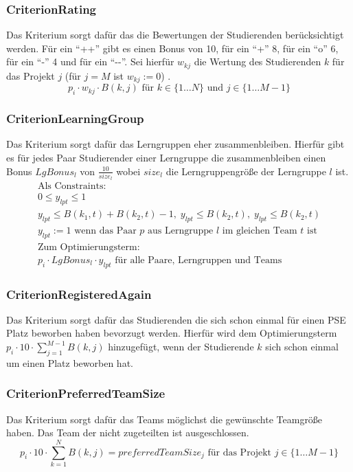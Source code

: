 \documentclass[parskip=full]{scrartcl}
\begin{document}
\subsubsection{CriterionRating}
Das Kriterium sorgt dafür das die Bewertungen der Studierenden berücksichtigt
werden. Für ein \enquote{++} gibt es einen Bonus von 10, für ein \enquote{+} 8,
für ein \enquote{o} 6, für ein \enquote{-} 4 und für ein \enquote{-{}-}. Sei
hierfür $w_{kj}$ die Wertung des Studierenden $k$ für das Projekt $j$ (für $j =
M$ ist $w_{kj} := 0$) .
\begin{equation*}
p_i \cdot w_{kj} \cdot B(k,j) \text{ für } k \in \{ 1\ldots N \} \text{ und }j
\in \{ 1\ldots M -1 \}
\end{equation*}

\subsubsection{CriterionLearningGroup}
Das Kriterium sorgt dafür das Lerngruppen eher zusammenbleiben. Hierfür gibt es
für jedes Paar Studierender einer Lerngruppe die zusammenbleiben einen Bonus
$LgBonus_l$ von $\frac{10}{size_l}$ wobei $size_l$ die Lerngruppengröße der
Lerngruppe $l$ ist.
\begin{gather*}
\text{Als Constraints: }\\
0 \le y_{lpt} \le 1  \\
y_{lpt} \le B(k_1,t) + B(k_2,t) -1, \; y_{lpt} \le B(k_2,t), \; y_{lpt} \le
B(k_2,t) \\
\text{$y_{lpt} := 1$ wenn das Paar $p$ aus
Lerngruppe $l$ im gleichen Team $t$ ist} \\
\text{Zum Optimierungsterm: } \\
p_i \cdot LgBonus_l \cdot y_{lpt} \text{ für alle Paare, Lerngruppen und Teams}
\end{gather*} %

\subsubsection{CriterionRegisteredAgain}
Das Kriterium sorgt dafür das Studierenden die sich schon einmal für einen PSE
Platz beworben haben bevorzugt werden. Hierfür wird dem Optimierungsterm
$p_i \cdot 10 \cdot \sum_{j = 1}^{M-1} B(k,j)$ hinzugefügt, wenn der
Studierende $k$ sich schon einmal um einen Platz beworben hat.
\subsubsection{CriterionPreferredTeamSize}
Das Kriterium sorgt dafür das Teams möglichst die gewünschte Teamgröße haben.
Das Team der nicht zugeteilten ist ausgeschlossen.
\begin{equation*}
p_i \cdot 10 \cdot \sum_{k = 1}^{N} B(k,j) = preferredTeamSize_j
\text{ für das Projekt }  j \in \{ 1\ldots M-1 \} %
\end{equation*}
\end{document}
